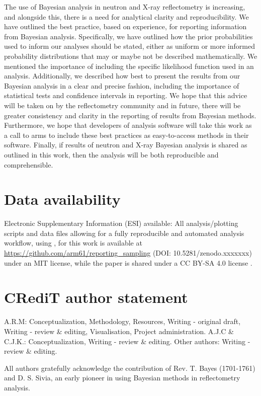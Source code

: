 \documentclass[reprint,superscriptaddress,aps,amsmath,linenumbers]{revtex4-2}
\begin{document}
The use of Bayesian analysis in neutron and X-ray reflectometry is increasing, and alongside this, there is a need for analytical clarity and reproducibility. 
We have outlined the best practice, based on experience, for reporting information from Bayesian analysis. 
Specifically, we have outlined how the prior probabilities used to inform our analyses should be stated, either as uniform or more informed probability distributions that may or maybe not be described mathematically. 
We mentioned the importance of including the specific likelihood function used in an analysis. 
Additionally, we described how best to present the results from our Bayesian analysis in a clear and precise fashion, including the importance of statistical tests and confidence intervals in reporting.
We hope that this advice will be taken on by the reflectometry community and in future, there will be greater consistency and clarity in the reporting of results from Bayesian methods.
Furthermore, we hope that developers of analysis software will take this work as a call to arms to include these best practices as easy-to-access methods in their software.
Finally, if results of neutron and X-ray Bayesian analysis is shared as outlined in this work, then the analysis will be both reproducible and comprehensible.

\section*{Data availability}

Electronic Supplementary Information (ESI) available: All analysis/plotting scripts and data files allowing for a fully reproducible and automated analysis workflow, using \showyourwork \cite{luger_showyourwork_2021}, for this work is available at \url{https://github.com/arm61/reporting_sampling} (DOI: 10.5281/zenodo.xxxxxxx) under an MIT license, while the paper is shared under a CC BY-SA 4.0 license \cite{mccluskey_github_2022}.

\section*{CR\lowercase{e}d\lowercase{i}T author statement}
\label{sec:credit}

A.R.M: Conceptualization, Methodology, Resources, Writing - original draft, Writing - review \& editing, Visualisation, Project administration.
A.J.C \& C.J.K.: Conceptualization, Writing - review \& editing.
Other authors: Writing - review \& editing.

\begin{acknowledgments}
    All authors gratefully acknowledge the contribution of Rev. T. Bayes (1701-1761) and D. S. Sivia, an early pioneer in using Bayesian methods in reflectometry analysis.
\end{acknowledgments}



\end{document}
